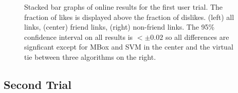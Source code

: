 \begin{figure}[t!]
\caption{Stacked bar graphs of online results for the first 
user trial.  The fraction of likes is displayed above 
the fraction of dislikes.  (left) all links, (center) friend links,
(right) non-friend links.  The 95\% confidence interval on all 
results is $< \pm 0.02$ so all differences are signficant
except for MBox and SVM in the center and the virtual tie
between three algorithms on the right.}
\label{fig:OnlineResult1}
\end{figure}


\subsection{Second Trial} 

